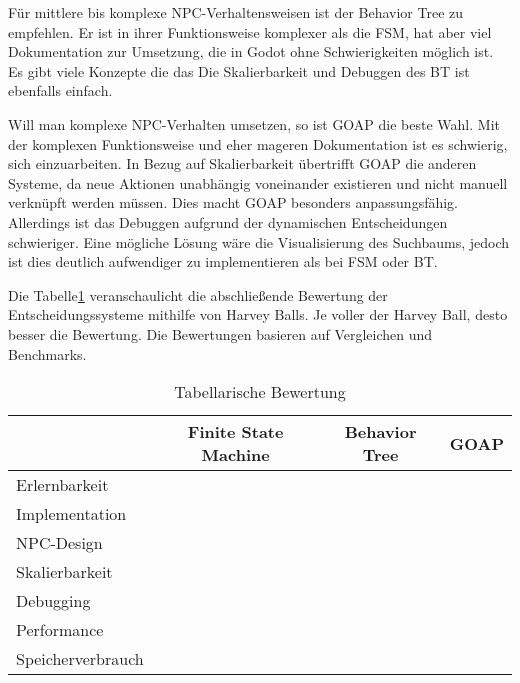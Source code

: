F\"{u}r mittlere bis komplexe NPC-Verhaltensweisen ist der Behavior Tree zu empfehlen. Er ist in ihrer Funktionsweise komplexer als die FSM, hat aber viel Dokumentation zur Umsetzung, die in Godot ohne Schwierigkeiten m\"{o}glich ist. Es gibt viele Konzepte die das 
Die Skalierbarkeit und Debuggen des BT ist ebenfalls einfach.

Will man komplexe NPC-Verhalten umsetzen, so ist GOAP die beste Wahl. Mit der komplexen Funktionsweise und eher mageren Dokumentation ist es schwierig, sich einzuarbeiten. In Bezug auf Skalierbarkeit \"{u}bertrifft GOAP die anderen Systeme, da neue Aktionen unabh\"{a}ngig voneinander existieren und nicht manuell verkn\"{u}pft werden m\"{u}ssen. Dies macht GOAP besonders anpassungsf\"{a}hig. Allerdings ist das Debuggen aufgrund der dynamischen Entscheidungen schwieriger. Eine m\"{o}gliche L\"{o}sung w\"{a}re die Visualisierung des Suchbaums, jedoch ist dies deutlich aufwendiger zu implementieren als bei FSM oder BT.

Die Tabelle\ref{tab:es vergleich tabelle} veranschaulicht die abschlie\ss{}ende Bewertung der Entscheidungssysteme mithilfe von Harvey Balls. Je voller der Harvey Ball, desto besser die Bewertung. Die Bewertungen basieren auf Vergleichen und Benchmarks.


\begin{table}[h]
  \caption{Tabellarische Bewertung}
  \label{tab:es vergleich tabelle}
  \centering
  \begin{tabular}{lccc}
    \toprule
    & Finite State Machine & Behavior Tree & GOAP\\
    \midrule
		Erlernbarkeit & \harveyBallFull & \harveyBallThreeQuarter & \harveyBallHalf\\
    Implementation	& \harveyBallFull  & \harveyBallThreeQuarter  & \harveyBallHalf\\
		NPC-Design & \harveyBallQuarter & \harveyBallThreeQuarter & \harveyBallFull\\
    Skalierbarkeit	& \harveyBallQuarter & \harveyBallHalf & \harveyBallFull\\
    Debugging	& \harveyBallHalf & \harveyBallThreeQuarter & \harveyBallQuarter\\
		Performance & \harveyBallFull & \harveyBallThreeQuarter & \harveyBallHalf\\
		Speicherverbrauch & \harveyBallFull & \harveyBallFull & \harveyBallThreeQuarter\\
    \bottomrule
  \end{tabular}
\end{table}